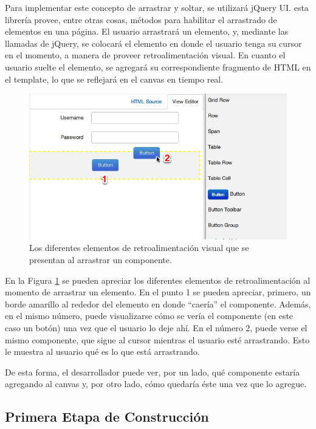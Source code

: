 \documentclass[12pt,titlepage,]{article}
\makeatletter
\def\maxwidth{\ifdim\Gin@nat@width>\linewidth\linewidth
\else\Gin@nat@width\fi}
\let\Oldincludegraphics\includegraphics
\renewcommand{\includegraphics}[1]{\Oldincludegraphics[width=\maxwidth]{#1}}
\makeatother
\begin{document}
Para implementar este concepto de arrastrar y soltar, se utilizará
jQuery UI. esta librería provee, entre otras cosas, métodos para
habilitar el arrastrado de elementos en una página. El usuario
arrastrará un elemento, y, mediante las llamadas de jQuery, se colocará
el elemento en donde el usuario tenga su cursor en el momento, a manera
de proveer retroalimentación visual. En cuanto el usuario suelte el
elemento, se agregará su correspondiente fragmento de HTML en el
template, lo que se reflejará en el canvas en tiempo real.

\begin{figure}[htbp]
\centering
\includegraphics{figures/drag-editor.png}
\caption{Los diferentes elementos de retroalimentación visual que se
presentan al arrastrar un componente. \label{figures:drag-editor}}
\end{figure}

En la Figura \ref{figures:drag-editor} se pueden apreciar los diferentes
elementos de retroalimentación al momento de arrastrar un elemento. En
el punto 1 se pueden apreciar, primero, un borde amarillo al rededor del
elemento en donde ``caería'' el componente. Además, en el mismo número,
puede visualizarse cómo se vería el componente (en este caso un botón)
una vez que el usuario lo deje ahí. En el número 2, puede verse el mismo
componente, que sigue al cursor mientras el usuario esté arrastrando.
Esto le muestra al usuario qué es lo que está arrastrando.

De esta forma, el desarrollador puede ver, por un lado, qué componente
estaría agregando al canvas y, por otro lado, cómo quedaría éste una vez
que lo agregue.

\subsection{Primera Etapa de Construcción}
\end{document}
